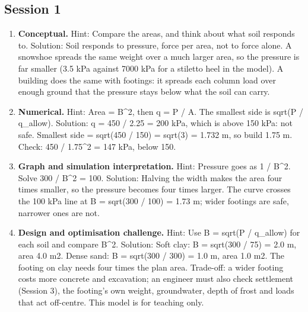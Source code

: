 \documentclass[11pt,a4paper]{article}
\begin{document}
\subsection*{Session 1}
\begin{enumerate}[nosep]
\item \textbf{Conceptual.} Hint: Compare the areas, and think about what soil responds to. Solution: Soil responds to pressure, force per area, not to force alone. A snowshoe spreads the same weight over a much larger area, so the pressure is far smaller (3.5 kPa against 7000 kPa for a stiletto heel in the model). A building does the same with footings: it spreads each column load over enough ground that the pressure stays below what the soil can carry.
\item \textbf{Numerical.} Hint: Area = B\textasciicircum{}2, then q = P / A. The smallest side is sqrt(P / q\_allow). Solution: q = 450 / 2.25 = 200 kPa, which is above 150 kPa: not safe. Smallest side = sqrt(450 / 150) = sqrt(3) = 1.732 m, so build 1.75 m. Check: 450 / 1.75\textasciicircum{}2 = 147 kPa, below 150.
\item \textbf{Graph and simulation interpretation.} Hint: Pressure goes as 1 / B\textasciicircum{}2. Solve 300 / B\textasciicircum{}2 = 100. Solution: Halving the width makes the area four times smaller, so the pressure becomes four times larger. The curve crosses the 100 kPa line at B = sqrt(300 / 100) = 1.73 m; wider footings are safe, narrower ones are not.
\item \textbf{Design and optimisation challenge.} Hint: Use B = sqrt(P / q\_allow) for each soil and compare B\textasciicircum{}2. Solution: Soft clay: B = sqrt(300 / 75) = 2.0 m, area 4.0 m2. Dense sand: B = sqrt(300 / 300) = 1.0 m, area 1.0 m2. The footing on clay needs four times the plan area. Trade-off: a wider footing costs more concrete and excavation; an engineer must also check settlement (Session 3), the footing's own weight, groundwater, depth of frost and loads that act off-centre. This model is for teaching only.
\end{enumerate}
\end{document}

